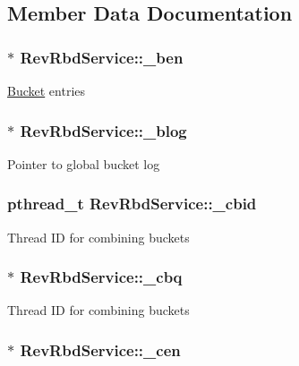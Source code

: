 \subsection{\-Member \-Data \-Documentation}
\hypertarget{structRevRbdService_ab7bd304aa0624565ed60190a286c8669}{
\subsubsection[{\-\_\-ben}]{$\ast$ {\bf \-Rev\-Rbd\-Service\-::\-\_\-ben}}}\label{structRevRbdService_ab7bd304aa0624565ed60190a286c8669}
\hyperlink{structBucket}{\-Bucket} entries \hypertarget{structRevRbdService_a1528c84cc4d8ad6bcfc43d26e6231168}{
\subsubsection[{\-\_\-blog}]{$\ast$ {\bf \-Rev\-Rbd\-Service\-::\-\_\-blog}}}\label{structRevRbdService_a1528c84cc4d8ad6bcfc43d26e6231168}
\-Pointer to global bucket log \hypertarget{structRevRbdService_a427dc474e0daee01da054c009ef6b9ac}{
\subsubsection[{\-\_\-cbid}]{\setlength{\rightskip}{0pt plus 5cm}pthread\-\_\-t {\bf \-Rev\-Rbd\-Service\-::\-\_\-cbid}}}\label{structRevRbdService_a427dc474e0daee01da054c009ef6b9ac}
\-Thread \-I\-D for combining buckets \hypertarget{structRevRbdService_a01ff6e2738fc213742c7f82af459c7fe}{
\subsubsection[{\-\_\-cbq}]{$\ast$ {\bf \-Rev\-Rbd\-Service\-::\-\_\-cbq}}}\label{structRevRbdService_a01ff6e2738fc213742c7f82af459c7fe}
\-Thread \-I\-D for combining buckets \hypertarget{structRevRbdService_a0c9cd164272c0bbda1ff1927a431c669}{
\subsubsection[{\-\_\-cen}]{$\ast$ {\bf \-Rev\-Rbd\-Service\-::\-\_\-cen}}}\label{structRevRbdService_a0c9cd164272c0bbda1ff1927a431c669}
